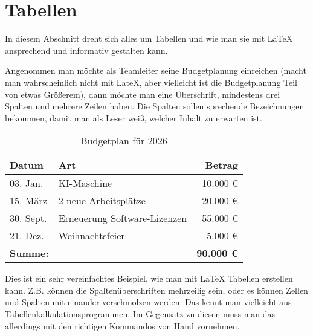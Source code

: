 \section{Tabellen}

In diesem Abschnitt dreht sich alles um Tabellen und wie man sie mit LaTeX ansprechend und informativ gestalten kann.

Angenommen man möchte als Teamleiter seine Budgetplanung einreichen (macht man wahrscheinlich nicht mit LateX, aber vielleicht ist die Budgetplanung Teil von etwas Größerem), dann möchte man eine Überschrift, mindestens drei Spalten und mehrere Zeilen haben. Die Spalten sollen sprechende Bezeichnungen bekommen, damit man als Leser weiß, welcher Inhalt zu erwarten ist.

	\begin{table}[h!]
		\centering
		\caption{Budgetplan für 2026}
		\begin{tabular}{|l|l|r|}
			\toprule
			\textbf{Datum} & \textbf{Art} & \textbf{Betrag} \\
			\midrule
			03. Jan.  & KI-Maschine 				 & 10.000 € \\
			15. März  & 2 neue Arbeitsplätze 		 & 20.000 € \\
			30. Sept. & Erneuerung Software-Lizenzen & 55.000 € \\
			21. Dez.  & Weihnachtsfeier 			 &  5.000 € \\
			\midrule
			\textbf{Summe:}    &					 & \textbf{90.000 €} \\
			\bottomrule
		\end{tabular}	
\end{table}

Dies ist ein sehr vereinfachtes Beispiel, wie man mit LaTeX Tabellen erstellen kann. Z.B. können die Spaltenüberschriften mehrzeilig sein, oder es können Zellen und Spalten mit einander verschmolzen werden. Das kennt man vielleicht aus Tabellenkalkulationsprogrammen. Im Gegensatz zu diesen muss man das allerdings mit den richtigen Kommandos von Hand vornehmen.